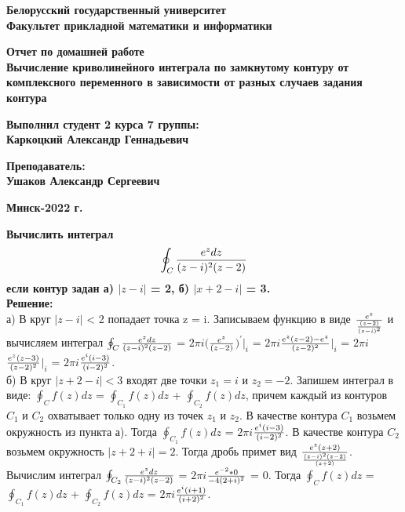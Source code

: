 \documentclass[14pt,a4paper,report]{article}
\begin{document}
	\begin{titlepage}
		\begin{center}
			\textbf{\LARGE Белорусский государственный университет\\[5mm]
				Факультет прикладной математики и информатики\\[45mm]}
			
			\vfill
			
			\textbf{\LARGE Отчет по домашней работе\\[5mm]
				Вычисление криволинейного интеграла по замкнутому контуру от комплексного переменного в зависимости от разных случаев задания контура\\[35mm]
			}
		\end{center}
		
		\hfill
		\begin{minipage}{.40\textwidth}
			\textbf{\Large Выполнил студент 2 курса 7 группы:\\[2mm] 
			Каркоцкий Александр Геннадьевич}
			
			\textbf{\Large Преподаватель:\\[2mm] 
			Ушаков Александр Сергеевич\\[5mm]}
		\end{minipage}%
		\vfill
		\begin{center}
			\textbf{\Large Минск-2022 г.}
		\end{center}
	\end{titlepage}
	
\textbf{\Large Вычислить интеграл\begin{equation*}\oint_C{e^z dz \over{(z-i)^2(z-2)}}\end{equation*} если контур задан а) $|z-i|$ = 2, б) $|x+2-i|$ = 3.\\[5mm]}
	\textbf{\Large	Решение:\\[5mm]}
\Large{а) В круг $|z - i|$ < 2 попадает точка z = i. Записываем функцию в виде $e^z \over{(z-2)\over{(z-i)^2}}$ и вычисляем интеграл $\oint_C{ e^z dz \over{(z-i)^2(z-2)}}$ = $2\pi i($$ e^z \over(z-2)$$)^\prime$$|_i$ = $2\pi i$$e^z(z-2) - e^z \over(z-2)^2$$|_i$ = $2\pi i$$e^z(z-3) \over(z-2)^2$$|_i$ = $2\pi i$$e^i(i-3) \over(i-2)^2$.\\[5mm]
б) В круг $|z + 2 - i| < 3$ входят две точки $z_1 = i$ и $z_2 = -2$. Запишем интеграл в виде: $\oint_C{f(z)dz}$ = $\oint_{C_1}{f(z)dz}$ + $\oint_{C_2}{f(z)dz}$, причем каждый из контуров $C_1$ и $C_2$ охватывает только одну из точек $z_1$ и $z_2$. В качестве контура $C_1$ возьмем окружность из пункта а). Тогда $\oint_{C_1}{f(z)dz}$ = $2\pi i$$e^i(i-3) \over(i-2)^2$.
В качестве контура $C_2$ возьмем окружность $|z + 2 + i| = 2$. Тогда дробь примет вид $e^z(z+2) \over{(z-i)^2(z-2)\over{(z+2)}}$. Вычислим интеграл $\oint_{C_2}{e^z dz \over{(z-i)^2(z-2)}}$ = $2 \pi i$$e^{-2}*0 \over-4(2+i)^2$ = $0$. Тогда  $\oint_C{f(z)dz}$ = $\oint_{C_1}{f(z)dz}$ + $\oint_{C_2}{f(z)dz}$ = $2\pi i$$e^i(i+1) \over(i+2)^2$.}
\end{document}
